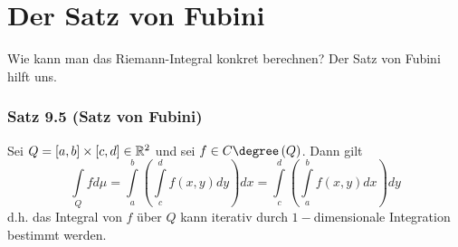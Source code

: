 \section{Der Satz von Fubini}
Wie kann man das Riemann-Integral konkret berechnen? Der Satz von Fubini hilft uns.

\subsubsection*{Satz 9.5 (Satz von Fubini)}
Sei $Q=\lbrack a,b\rbrack\times \lbrack c,d\rbrack\in\mathbb{R}^2$ und sei $f\in C\degree\left( Q\right)$. Dann gilt \[\int\limits_Q {fd\mu }  = \int\limits_a^b {\left( {\int\limits_c^d {f\left( {x,y} \right)dy} } \right)dx = \int\limits_c^d {\left( {\int\limits_a^b {f\left( {x,y} \right)dx} } \right)dy} } \]
d.h. das Integral von $f$ über $Q$ kann iterativ durch $1-$dimensionale Integration bestimmt werden.

